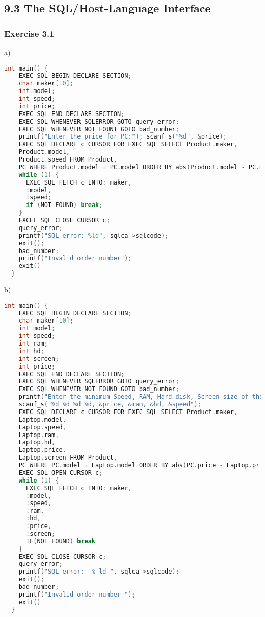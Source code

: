 \documentclass[../../main.tex]{subfiles}
\begin{document}
\subsection{9.3 The SQL/Host-Language Interface}

\subsubsection*{Exercise 3.1}

a)

\begin{lstlisting}[language=c]
  int main() {
    EXEC SQL BEGIN DECLARE SECTION;
    char maker[10];
    int model;
    int speed;
    int price;
    EXEC SQL END DECLARE SECTION;
    EXEC SQL WHENEVER SQLERROR GOTO query_error;
    EXEC SQL WHENEVER NOT FOUNT GOTO bad_number;
    printf("Enter the price for PC:"); scanf_s("%d", &price);
    EXEC SQL DECLARE c CURSOR FOR EXEC SQL SELECT Product.maker,
    Product.model,
    Product.speed FROM Product,
    PC WHERE Product.model = PC.model ORDER BY abs(Product.model - PC.model) EXEC SQL OPEN CURSOR c;
    while (1) {
      EXEC SQL FETCH c INTO: maker,
      :model,
      :speed;
      if (NOT FOUND) break;
    }
    EXCEL SQL CLOSE CURSOR c;
    query_error;
    printf("SQL error: %ld", sqlca->sqlcode);
    exit();
    bad_number;
    printf("Invalid order number");
    exit()
  }
\end{lstlisting}

b)

\begin{lstlisting}[language=c]
  int main() {
    EXEC SQL BEGIN DECLARE SECTION;
    char maker[10];
    int model;
    int speed;
    int ram;
    int hd;
    int screen;
    int price;
    EXEC SQL END DECLARE SECTION;
    EXEC SQL WHENEVER SQLERROR GOTO query_error;
    EXEC SQL WHENEVER NOT FOUND GOTO bad_number;
    printf("Enter the minimum Speed, RAM, Hard disk, Screen size of the PC");
    scanf_s("%d %d %d %d, &price, &ram, &hd, &speed");
    EXEC SQL DECLARE c CURSOR FOR EXEC SQL SELECT Product.maker,
    Laptop.model,
    Laptop.speed,
    Laptop.ram,
    Laptop.hd,
    Laptop.price,
    Laptop.screen FROM Product,
    PC WHERE PC.model = Laptop.model ORDER BY abs(PC.price - Laptop.price);
    EXEC SQL OPEN CURSOR c;
    while (1) {
      EXEC SQL FETCH c INTO: maker,
      :model,
      :speed,
      :ram,
      :hd,
      :price,
      :screen;
      IF(NOT FOUND) break
    }
    EXEC SQL CLOSE CURSOR c;
    query_error;
    printf("SQL error:  % ld ", sqlca->sqlcode);
    exit();
    bad_number;
    printf("Invalid order number ");
    exit()
  }
\end{lstlisting}
\end{document}
